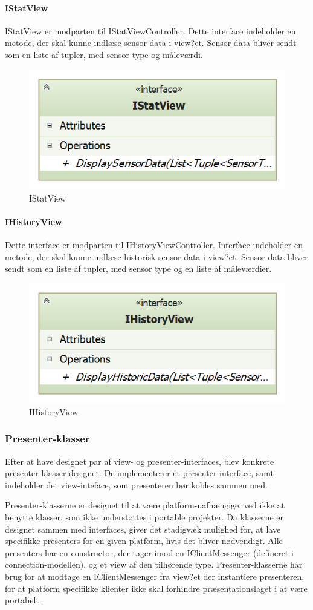 \paragraph{IStatView}
IStatView er modparten til IStatViewController. Dette interface indeholder en metode, der skal kunne indlæse sensor data i view?et. Sensor data bliver sendt som en liste af tupler, med sensor type og måleværdi.

\begin{figure}
	\centering
	\includegraphics[width=0.3\linewidth]{figs/design/application_istatview}
	\caption{IStatView}
	\label{fig:application_istatview}
\end{figure}

\paragraph{IHistoryView}
Dette interface er modparten til IHistoryViewController. Interface indeholder en metode, der skal kunne indlæse historisk sensor data i view?et. Sensor data bliver sendt som en liste af tupler, med sensor type og en liste af måleværdier.

\begin{figure}
	\centering
	\includegraphics[width=0.3\linewidth]{figs/design/application_ihistoryview}
	\caption{IHistoryView}
	\label{fig:application_ihistoryview}
\end{figure}

\subsubsection{Presenter-klasser}
Efter at have designet par af view- og presenter-interfaces, blev konkrete presenter-klasser designet. De implementerer et presenter-interface, samt indeholder det view-inteface, som presenteren bør kobles sammen med.

Presenter-klasserne er designet til at være platform-uafhængige, ved ikke at benytte klasser, som ikke understøttes i portable projekter. Da klasserne er designet sammen med interfaces, giver det stadigvæk mulighed for, at lave specifikke presenters for en given platform, hvis det bliver nødvendigt. Alle presenters har en constructor, der tager imod en IClientMessenger (defineret i connection-modellen), og et view af den tilhørende type. Presenter-klasserne har brug for at modtage en IClientMessenger fra view?et der instantiere presenteren, for at platform specifikke klienter ikke skal forhindre præsentationslaget i at være portabelt. 

